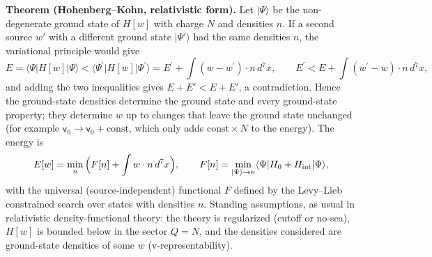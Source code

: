 \documentclass[10pt,a4paper]{article}
\begin{document}
\textbf{Theorem (Hohenberg–Kohn, relativistic form).} Let $|\Psi\rangle$ be the non-degenerate ground state of $H[w]$ with charge $N$ and densities $n$. If a second source $w'$ with a different ground state $|\Psi'\rangle$ had the same densities $n$, the variational principle would give
\begin{equation*}
E=\langle\Psi|H[w]|\Psi\rangle<\langle\Psi^{\prime}|H[w]|\Psi^{\prime}\rangle=E^{\prime}+\int(w-w^{\prime})\cdot n\,d^7x,\qquad E^{\prime}<E+\int(w^{\prime}-w)\cdot n\,d^7x,
\end{equation*}
and adding the two inequalities gives $E+E'<E+E'$, a contradiction. Hence the ground-state densities determine the ground state and every ground-state property; they determine $w$ up to changes that leave the ground state unchanged (for example $\mathsf v_0\to\mathsf v_0+\text{const}$, which only adds $\text{const}\times N$ to the energy). The energy is
\begin{equation*}
E[w]=\min_n\Big(F[n]+\int w\cdot n\,d^7x\Big),\qquad F[n]=\min_{|\Psi\rangle\to n}\langle\Psi|H_0+H_{\rm int}|\Psi\rangle,
\end{equation*}
with the universal (source-independent) functional $F$ defined by the Levy–Lieb constrained search over states with densities $n$. Standing assumptions, as usual in relativistic density-functional theory: the theory is regularized (cutoff or no-sea), $H[w]$ is bounded below in the sector $Q=N$, and the densities considered are ground-state densities of some $w$ (v-representability).
\end{document}
